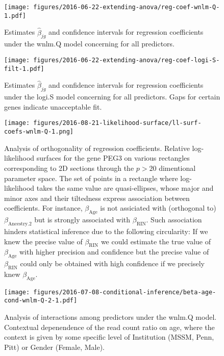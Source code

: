 \documentclass[letterpaper]{article}
\begin{document}
\begin{figure}
\begin{center}
\texttt{[image: figures/2016-06-22-extending-anova/reg-coef-wnlm-Q-1.pdf]}
\end{center}
\caption{
Estimates \(\hat{\beta}_{jg}\) and confidence intervals for regression
coefficients under the wnlm.Q model concerning for all predictors.
}
\label{fig:all-effects-wnlm.Q}
\end{figure}

\begin{figure}
\begin{center}
\texttt{[image: figures/2016-06-22-extending-anova/reg-coef-logi-S-filt-1.pdf]}
\end{center}
\caption{
Estimates \(\hat{\beta}_{jg}\) and confidence intervals for regression
coefficients under the logi.S model concerning for all predictors.  Gaps
for certain genes indicate unacceptable fit.
}
\label{fig:all-effects-logi.S}
\end{figure}

\begin{figure}
\begin{center}
\texttt{[image: figures/2016-08-21-likelihood-surface/ll-surf-coefs-wnlm-Q-1.png]}
\end{center}
\caption{
Analysis of orthogonality of regression coefficients.  Relative log-likelihood
surfaces for the gene PEG3 on various rectangles corresponding to 2D sections
through the \(p>20\) dimentional parameter space.  The set of points in a
rectangle where log-likelihood takes the same value are quasi-ellipses, whose
major and minor axes and their tiltedness express association between
coefficients.  For instance, \(\beta_\mathrm{Age}\) is not assiciated with
(orthogonal to) \(\beta_\mathrm{Ancestry.2}\) but is strongly associated with
\(\beta_\mathrm{RIN}\).  Such association hinders statistical inference due to
the following circularity: If we knew the precise value of
\(\beta_\mathrm{RIN}\) we could estimate the true value of
\(\beta_\mathrm{Age}\) with higher precision and confidence but the precise
value of \(\beta_\mathrm{RIN}\) could only be obtained with high confidence if
we precisely knew \(\beta_\mathrm{Age}\).
}
\label{fig:ll-non-orthogonality}
\end{figure}

\begin{figure}
\begin{center}
\texttt{[image: figures/2016-07-08-conditional-inference/beta-age-cond-wnlm-Q-2-1.pdf]}
\end{center}
\caption{
Analysis of interactions among predictors under the wnlm.Q model.  Contextual depenendence of the
read count ratio on age, where the context is given by some specific level of
Institution (MSSM, Penn, Pitt) or Gender (Female, Male).
}
\label{fig:interaction-wnlm.Q}
\end{figure}
\end{document}
